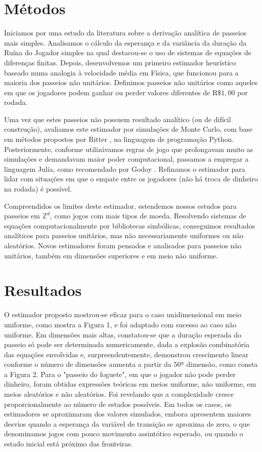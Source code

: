 \documentclass[a4paper,10pt,twocolumn]{article}
\begin{document}
\section{Métodos}

Iniciamos por uma estudo da literatura sobre a derivação analítica de passeios
mais simples. Analisamos o cálculo da esperança e da variância da duração da
Ruína do Jogador simples \cite{andel_variance_2012} na qual destacou-se o uso de
sistemas de equações de diferenças finitas. Depois, desenvolvemos um primeiro
estimador heurístico baseado numa analogia à velocidade média em Física, que
funcionou para a maioria dos passeios não unitários. Definimos passeios não
unitários como aqueles em que os jogadores podem ganhar ou perder valores
diferentes de $\mathrm{R}\$1,00$ por rodada.

Uma vez que estes passeios não possuem resultado analítico (ou de difícil
construção), avaliamos este estimador por simulações de Monte Carlo, com base em
métodos propostos por Ritter \cite{ritter_determining_2011}, na linguagem de
programação Python. Posteriormente, conforme utilizávamos regras de jogo que
prolongavam muito as simulações e demandavam maior poder computacional, passamos
a empregar a linguagem Julia, como recomendado por Godoy
\cite{godoy_evaluating_2023}. Refinamos o estimador para lidar com situações em
que o empate entre os jogadores (não há troca de dinheiro na rodada) é
possível.

Compreendidos os limites deste estimador, estendemos nossos estudos para
passeios em $\mathbb{Z}^d$, como jogos com mais tipos de moeda. Resolvendo
sistemas de equações computacionalmente por bibliotecas simbólicas, conseguimos
resultados analíticos para passeios unitários, mas não necessariamente uniformes
ou não aleatórios. Novos estimadores foram pensados e analisados para passeios
não unitários, também em dimensões superiores e em meio não uniforme.

\section{Resultados}

O estimador proposto mostrou-se eficaz para o caso unidimensional em meio
uniforme, como mostra a Figura 1, e foi adaptado com sucesso ao caso não
uniforme. Em dimensões mais altas, constatou-se que a duração esperada do
passeio só pode ser determinada numericamente, dada a explosão combinatória das
equações envolvidas e, surpreendentemente, demonstrou crescimento linear
conforme o número de dimensões aumenta a partir da $50$ª dimensão, como consta a
Figura 2. Para o "passeio do foguete", em que o jogador não pode perder
dinheiro, foram obtidas expressões teóricas em meios uniforme, não uniforme, em
meios aleatórios e não aleatórios. Foi revelando que a complexidade cresce
proporcionalmente ao número de estados possíveis. Em todos os casos, os
estimadores se aproximaram dos valores simulados, embora apresentem maiores
desvios quando a esperança da variável de transição se aproxima de zero, o que
denominamos jogos com pouco movimento assintótico esperado, ou quando o estado
inicial está próximo das fronteiras.
\end{document}
